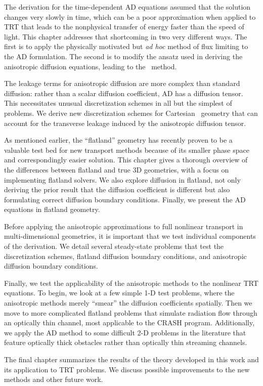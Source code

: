 The derivation for the time-dependent AD equations assumed that the solution
changes very slowly in time, which can be a poor approximation when applied to
TRT that leads to the nonphysical transfer of energy faster than the speed of
light. This chapter addresses that shortcoming in two very different ways. The
first is to apply the physically motivated but \emph{ad hoc} method of flux
limiting to the AD formulation. The second is to modify the ansatz used in
deriving the anisotropic diffusion equations, leading to the \APone\ method.

The leakage terms for anisotropic diffusion are more complex than standard
diffusion: rather than a scalar diffusion coefficient, AD has a diffusion
tensor. This necessitates unusual discretization schemes in all but the simplest
of problems. We derive new discretization schemes for Cartesian \xy\ geometry
that can account for the transverse leakage induced by the anisotropic diffusion
tensor.

As mentioned earlier, the ``flatland'' geometry has recently proven to be a
valuable test bed for new transport methods because of its smaller phase space
and correspondingly easier solution. This chapter gives a thorough overview of
the differences between flatland and true 3D geometries, with a focus on
implementing flatland solvers. We also explore diffusion in flatland, not only
deriving the prior result that the diffusion coefficient is different but also
formulating correct diffusion boundary conditions. Finally, we present the AD
equations in flatland geometry.

Before applying the anisotropic approximations to full nonlinear transport in
multi-dimensional geometries, it is important that we test individual components
of the derivation. We detail several steady-state problems that test the
discretization schemes, flatland diffusion boundary conditions, and anisotropic
diffusion boundary conditions.

Finally, we test the applicability of the anisotropic methods to the nonlinear
TRT equations. To begin, we look at a few simple 1-D test problems, where the
anisotropic methods merely ``smear'' the diffusion coefficients spatially. Then
we move to more complicated flatland problems that simulate radiation flow
through an optically thin channel, most applicable to the CRASH program.
Additionally, we apply the AD method to some difficult 2-D problems in the
literature that feature optically thick obstacles rather than optically thin
streaming channels.

The final chapter summarizes the results of the theory developed in this work
and its application to TRT problems. We discuss possible improvements to the new
methods and other future work.

